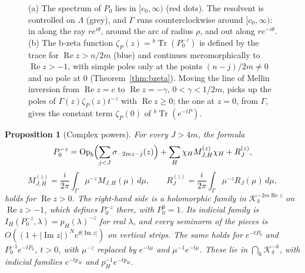 \documentclass[11pt,oneside,reqno]{article}
\DeclareMathOperator{\Tr}{Tr}
\theoremstyle{plain}
\newtheorem{proposition}[theorem]{Proposition}
\theoremstyle{definition}
\theoremstyle{remark}
\begin{document}
\begin{figure}[tbp]
\caption[The resolvent contour and the b-zeta function]{(a) The
spectrum of \(P_0\) lies in \([c_0,\infty)\) (red dots). The resolvent is
controlled on \(\Lambda\) (grey), and \(\Gamma\) runs counterclockwise
around \([c_0,\infty)\): in along the ray \(re^{i\theta}\), around the arc
of radius \(\rho\), and out along \(re^{-i\theta}\). (b) The b-zeta
function \(\zeta_P(z)={}^b\Tr(P_0^{-z})\) is defined by the trace for
\(\operatorname{Re}z>n/2m\) (blue) and continues meromorphically to
\(\operatorname{Re}z>-1\), with simple poles only at the points
\((n-j)/2m\neq0\) and no pole at \(0\) (Theorem~\ref{thm:bzeta}). Moving
the line of Mellin inversion from \(\operatorname{Re}z=c\) to
\(\operatorname{Re}z=-\gamma\), \(0<\gamma<1/2m\), picks up the poles of
\(\Gamma(z)\zeta_P(z)t^{-z}\) with \(\operatorname{Re}z\geq0\); the one at
\(z=0\), from \(\Gamma\), gives the constant term \(\zeta_P(0)\) of
\({}^b\Tr(e^{-tP})\).}
\label{fig:contour}
\end{figure}

\begin{proposition}[Complex powers]\label{prop:cp}
For every \(J>4m\), the formula
\[
 P_0^{-z}=\operatorname{Op}_b\Bigl(\sum_{j<J}\sigma_{-2mz-j}(z)\Bigr)
 +\sum_H\chi_HM^{(z)}_{J,H}\chi_H+R^{(z)}_J,
\]
\[
 M^{(z)}_{J,H}=\frac{i}{2\pi}\int_\Gamma\mu^{-z}M_{J,H}(\mu)\,d\mu,\qquad
 R^{(z)}_J=\frac{i}{2\pi}\int_\Gamma\mu^{-z}R_J(\mu)\,d\mu,
\]
holds for \(\operatorname{Re}z>0\). The right-hand side is a holomorphic
family in \(\mathcal K^{-2m\operatorname{Re}z}_\delta\) on
\(\operatorname{Re}z>-1\), which defines \(P_0^{-z}\) there, with
\(P_0^{0}=1\). Its indicial family is
\(I_H(P_0^{-z},\lambda)=p_H(\lambda)^{-z}\) for real \(\lambda\), and every
seminorm of the pieces is \(O((1+|\operatorname{Im}z|)^Ne^{\theta|
\operatorname{Im}z|})\) on vertical strips. The same holds for
\(e^{-tP_0}\) and \(P_0^{-1}e^{-tP_0}\), \(t>0\), with \(\mu^{-z}\) replaced by
\(e^{-t\mu}\) and \(\mu^{-1}e^{-t\mu}\). These lie in
\(\bigcap_k\mathcal K^{-k}_\delta\), with indicial families
\(e^{-tp_H}\) and \(p_H^{-1}e^{-tp_H}\).
\end{proposition}
\end{document}
